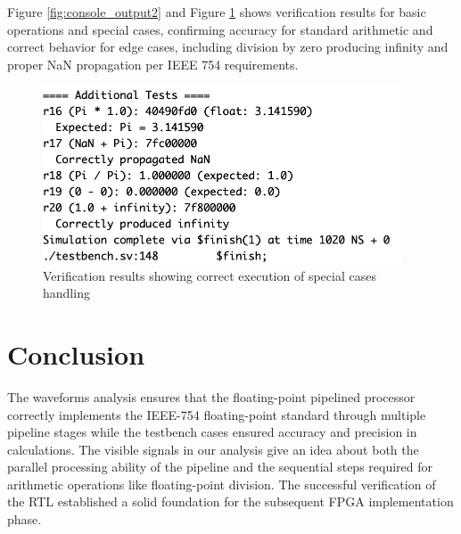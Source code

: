 Figure \ref{fig:console_output2} and Figure \ref{fig:console_output3} shows verification results for basic operations and special cases, confirming accuracy for standard arithmetic and correct behavior for edge cases, including division by zero producing infinity and proper NaN propagation per IEEE 754 requirements.

\begin{figure}[htbp]
    \centering
     \includegraphics[width=0.95\textwidth]{figures/waveform6.png} 
    \caption{Verification results showing correct execution of special cases handling}
    \label{fig:console_output3}
\end{figure}

\section{Conclusion}
\label{sec:verification_conclusion}

The waveforms analysis ensures that the floating-point pipelined processor correctly implements the IEEE-754 floating-point standard  through multiple pipeline stages while the testbench cases ensured accuracy and precision in calculations. The visible signals in our analysis give an idea about both the parallel processing ability of the pipeline and the sequential steps required for arithmetic operations like floating-point division. The successful verification of the RTL established a solid foundation for the subsequent FPGA implementation phase.